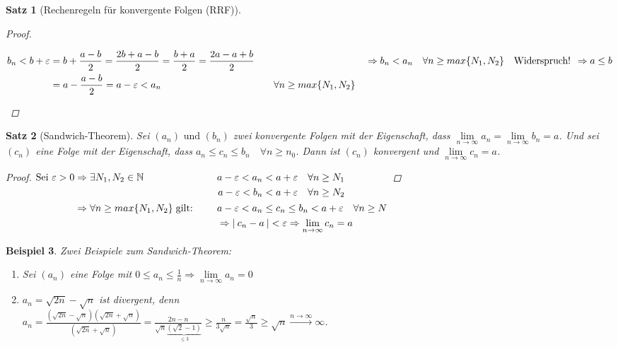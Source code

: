 \documentclass[a4paper,titlepage,oneside]{article}
\def\N{\ensuremath{\mathbb{N}} }
\renewcommand{\epsilon}{\ensuremath{\varepsilon} }
\def\WSP{\text{Widerspruch! }}
\def\sp{\hspace{0,1cm}}
\renewcommand{\liminf}[2][n]{\ensuremath{\lim\limits_{#1 \rightarrow \infty}{#2}}}
\newcommand{\abs}[1]{\ensuremath{\left|\:#1\:\right|}}
\newcommand{\longtoinf}[1][n]{\ensuremath{\overset{\scriptscriptstyle{#1 \to \infty}}{\longrightarrow}}}
\theoremstyle{thmstyle}
\newtheorem{satz}{Satz}[section]
\newtheorem{bsp}[satz]{Beispiel}
\theoremstyle{subthmstyle}
\begin{document}
\begin{satz}[Rechenregeln für konvergente Folgen (RRF)]
\begin{proof}
\begin{enumerate}
\begin{math}
\begin{aligned}[t]
b_n < b + \epsilon &= b + \frac{a-b}{2} = \frac{2b + a - b}{2} = \frac{b + a}{2} = \frac{2a - a + b}{2} \\
&= a - \frac{a-b}{2} = a - \epsilon < a_n && \quad \forall n \ge max\{N_1, N_2\}
\end{aligned} \\
\vphantom{\frac{1}{2}}\Rightarrow  b_n < a_n \quad \forall n \ge max\{N_1, N_2\} \quad \WSP \Rightarrow a \le b
\end{math}
\end{enumerate}
\end{proof}
\end{satz}

\begin{satz}[Sandwich-Theorem]
Sei \((a_n)\text{ und }(b_n)\) zwei konvergente Folgen mit der Eigenschaft, dass \(\liminf{a_n} = \liminf{b_n} = a\). Und sei \((c_n)\) eine Folge mit der Eigenschaft, dass \(a_n \le c_n \le b_n \quad \forall n \ge n_0\). Dann ist \((c_n)\) konvergent und \(\liminf{c_n} = a\).
\begin{proof}
\begin{math}
\begin{aligned}[t] \displaystyle \text{Sei }\epsilon > 0 &\Rightarrow \exists  N_1, N_2 \in \N 
&&\begin{aligned}[t] a - \epsilon < a_n < a + \epsilon & \quad \forall n \ge N_1 \\
			   a - \epsilon < b_n < a + \epsilon & \quad \forall n \ge N_2
\end{aligned} \\
&\Rightarrow \forall n \ge max\{N_1, N_2\} \sp \text{gilt: } \quad &&\begin{aligned}[t] &a-\epsilon < a_n \le c_n \le b_n < a + \epsilon \quad  \forall n \ge N \\
&\Rightarrow \abs{c_n - a} < \epsilon \Rightarrow \liminf{c_n} = a
\end{aligned}
\end{aligned}\\
\end{math}
\end{proof}
\end{satz}

\begin{bsp}
Zwei Beispiele zum Sandwich-Theorem:
\begin{enumerate}
\item Sei \((a_n)\) eine Folge mit \(0 \le a_n \le \frac{1}{n} \Rightarrow \liminf{a_n} = 0\)
\item \(a_n = \sqrt{2n} - \sqrt{n}\) ist divergent, denn \\
$ \displaystyle a_n = \frac{\left(\sqrt{2n} - \sqrt{n}\right)\left(\sqrt{2n} + \sqrt{n}\right)}{\left(\sqrt{2n} + \sqrt{n}\right)} = \frac{2n - n}{\sqrt{n} \underbrace{\left(\sqrt{2} - 1\right)}_{\le3}} \ge \frac{n}{3\sqrt{n}} = \frac{\sqrt{n}}{3} \ge \sqrt{n} \longtoinf \infty $.
\end{enumerate}
\end{bsp}
\end{document}
